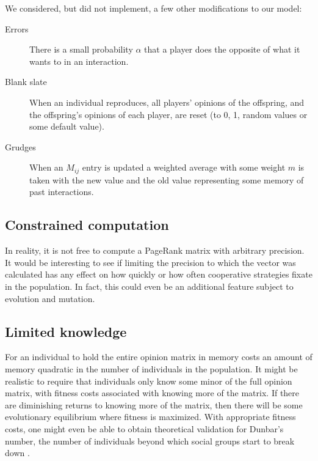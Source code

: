 \documentclass{amsart}
\begin{document}
We considered, but did not implement, a few other modifications to our
model:
\begin{description}
\item[Errors] There is a small probability $\alpha$ that a player does
  the opposite of what it wants to in an interaction.
\item[Blank slate] When an individual reproduces, all players'
  opinions of the offspring, and the offspring's opinions of each
  player, are reset (to 0, 1, random values or some default value).
\item[Grudges] When an $M_{ij}$ entry is updated a weighted average
  with some weight $m$ is taken with the new value and the old value
  representing some memory of past interactions.
\end{description}

\subsection{Constrained computation}

In reality, it is not free to compute a PageRank matrix with arbitrary
precision. It would be interesting to see if limiting the precision to
which the vector was calculated has any effect on how quickly or how
often cooperative strategies fixate in the population. In fact, this
could even be an additional feature subject to evolution and mutation.

\subsection{Limited knowledge}

For an individual to hold the entire opinion matrix in memory costs an
amount of memory quadratic in the number of individuals in the
population. It might be realistic to require that individuals only
know some minor of the full opinion matrix, with fitness costs
associated with knowing more of the matrix. If there are diminishing
returns to knowing more of the matrix, then there will be some
evolutionary equilibrium where fitness is maximized. With appropriate
fitness costs, one might even be able to obtain theoretical validation
for Dunbar's number, the number of individuals beyond which social
groups start to break down \cite{dunbar_neocortex_1995}.

 
\end{document}
